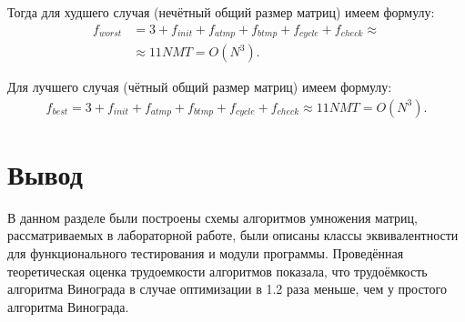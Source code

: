Тогда для худшего случая (нечётный общий размер матриц) имеем формулу:
\begin{equation}
	\label{сomplexity:vinograd_opt_worst}
	\begin{aligned}
		f_{worst} &= 3 + f_{init} + f_{atmp} + f_{btmp} + f_{cycle} + f_{check} \approx\\&\approx 11NMT = O(N^3).
	\end{aligned}
\end{equation}

Для лучшего случая (чётный общий размер матриц) имеем формулу:
\begin{equation}
	\label{сomplexity:vinograd_opt_best}
	\begin{aligned}
		f_{best} = 3 + f_{init} + f_{atmp} + f_{btmp} + f_{cycle} + f_{check} \approx 11NMT = O(N^3).
	\end{aligned}
\end{equation}

\section*{Вывод}

В данном разделе были построены схемы алгоритмов умножения матриц, рассматриваемых в лабораторной работе, были описаны классы эквивалентности для функционального тестирования и модули программы.
Проведённая теоретическая оценка трудоемкости алгоритмов показала, что трудоёмкость алгоритма Винограда в случае оптимизации в 1.2 раза меньше, чем у простого алгоритма Винограда.
